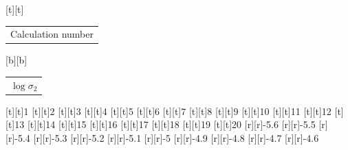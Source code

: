 %    
%
%
\begin{psfrags}%
\psfragscanon%
%
[t][t]{\color[rgb]{0,0,0}\setlength{\tabcolsep}{0pt}\begin{tabular}{c}{\Large{}Calculation number}\end{tabular}}%
[b][b]{\color[rgb]{0,0,0}\setlength{\tabcolsep}{0pt}\begin{tabular}{c}{\Large$\log \sigma_2$}\end{tabular}}%
%
[t][t]{1}%
[t][t]{2}%
[t][t]{3}%
[t][t]{4}%
[t][t]{5}%
[t][t]{6}%
[t][t]{7}%
[t][t]{8}%
[t][t]{9}%
[t][t]{10}%
[t][t]{11}%
[t][t]{12}%
[t][t]{13}%
[t][t]{14}%
[t][t]{15}%
[t][t]{16}%
[t][t]{17}%
[t][t]{18}%
[t][t]{19}%
[t][t]{20}%
%
[r][r]{-5.6}%
[r][r]{-5.5}%
[r][r]{-5.4}%
[r][r]{-5.3}%
[r][r]{-5.2}%
[r][r]{-5.1}%
[r][r]{-5}%
[r][r]{-4.9}%
[r][r]{-4.8}%
[r][r]{-4.7}%
[r][r]{-4.6}%
%
%
\end{psfrags}%
%
